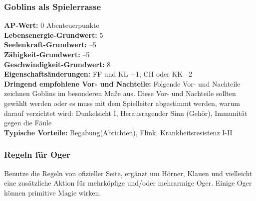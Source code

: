 \documentclass[9pt]{article}
\begin{document}
\begin{multicols}{2}
\begin{shaded*}
	\subsubsection{Goblins als Spielerrasse}
	\textbf{AP-Wert:} 0 Abenteuerpunkte
	\\
	\textbf{Lebensenergie-Grundwert:} 5
	\\
	\textbf{Seelenkraft-Grundwert:} –5
	\\
	\textbf{Zähigkeit-Grundwert:} –5
	\\
	\textbf{Geschwindigkeit-Grundwert:} 8
	\\
	\textbf{Eigenschaftsänderungen:} FF und KL +1; CH oder KK –2\\
	\textbf{Dringend empfohlene Vor- und Nachteile:} Folgende Vor- und Nachteile zeichnen Goblins im besonderen Maße aus. Diese Vor- und Nachteile sollten gewählt werden oder es muss mit dem Spielleiter abgestimmt werden, warum darauf verzichtet wird: Dunkelsicht I, Herausragender Sinn (Gehör), Immunität gegen die Fäule
	\\
	\textbf{Typische Vorteile:} Begabung(Abrichten), Flink, Krankheitsresistenz I-II
	\\
\end{shaded*}
\begin{shaded*}
	\subsubsection{Regeln für Oger}
	Benutze die Regeln von ofizieller Seite, ergänzt um Hörner, Klauen und vielleicht eine zusätzliche Aktion für mehrköpfige und/oder mehrarmige Oger. Einige Oger können primitive Magie wirken.
\end{shaded*}
	
	\begin{shaded*}		

\end{shaded*}
\end{multicols}
\end{document}

